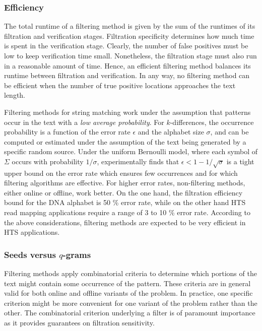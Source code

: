 \subsubsection{Efficiency}

The total runtime of a filtering method is given by the sum of the runtimes of its filtration and verification stages.
Filtration specificity determines how much time is spent in the verification stage.
Clearly, the number of false positives must be low to keep verification time small.
Nonetheless, the filtration stage must also run in a reasonable amount of time.
Hence, an efficient filtering method balances its runtime between filtration and verification.
In any way, no filtering method can be efficient when the number of true positive locations approaches the text length.

Filtering methods for string matching work under the assumption that patterns occur in the text with a \emph{low average probability}.
For $k$-differences, the occurrence probability is a function of the error rate $\epsilon$ and the alphabet size $\sigma$, and can be computed or estimated under the assumption of the text being generated by a specific random source.
Under the uniform Bernoulli model, where each symbol of $\Sigma$ occurs with probability $1/\sigma$, \cite{Navarro2001a} experimentally finds that $\epsilon < 1 - 1 / \sqrt{\sigma}$ is a tight upper bound on the error rate which ensures few occurrences and for which filtering algorithms are effective.
For higher error rates, non-filtering methods, either online or offline, work better.
On the one hand, the filtration efficiency bound for the DNA alphabet is 50 \% error rate, while on the other hand HTS read mapping applications require a range of 3 to 10 \% error rate.
According to the above considerations, filtering methods are expected to be very efficient in HTS applications.

\subsubsection{Seeds versus $q$-grams}

Filtering methods apply combinatorial criteria to determine which portions of the text might contain some occurrence of the pattern.
These criteria are in general valid for both online and offline variants of the problem.
In practice, one specific criterion might be more convenient for one variant of the problem rather than the other.
The combinatorial criterion underlying a filter is of paramount importance as it provides guarantees on filtration sensitivity.

